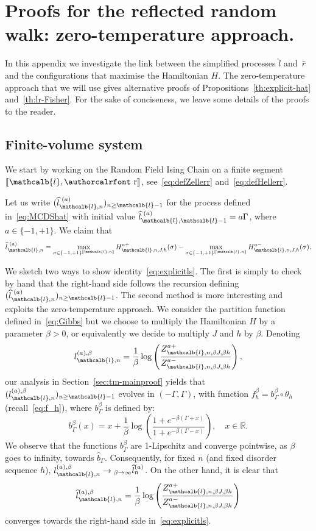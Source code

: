 \documentclass[10pt]{amsart}
\theoremstyle{definition}\newtheorem{defi}[theo]{Definition}\newtheorem{rema}[theo]{Remark}\newtheorem{exam}[theo]{Example}\newtheorem{exem}[theo]{Example}\newtheorem{nota}[theo]{Notation}
\newcommand{\mathcalc}[1]{\text{\authorcalrfont #1}}
\newcommand{\bbR}{\mathbb{R}}
\newcommand{\gb}{\beta}
\newcommand{\gG}{\Gamma}
\newcommand{\ls}{\widehat{l}}
\newcommand{\rs}{\widehat{r}}
\renewcommand{\ell}{\mathcalb{l}}
\newcommand{\err}{\mathcalc{r}}
\newcommand{\llbracket}{\mathopen{[\mkern -2.7mu[}}
\newcommand{\rrbracket}{\mathclose{]\mkern -2.7mu]}}
\newcommand{\lbra}{\llbracket}
\newcommand{\rbra}{\rrbracket}
\renewcommand*{\to}{\mathchoice{\longrightarrow}{\rightarrow}{\rightarrow}{\rightarrow}}
\begin{document}
\section{Proofs for the reflected random walk: zero-temperature approach.}\label{sec:appendzerotemp}


In this appendix we investigate the link between the simplified processes $\ls$ and~$\rs$ and the configurations that maximise the Hamiltonian $H$. The zero-temperature approach that we will use gives alternative proofs of Propositions~\ref{th:explicit-hat} and~\ref{th:lr-Fisher}. For the sake of conciseness, we leave some details of the proofs to the reader.

\subsection{Finite-volume system}

We start by working on the {Random Field Ising Chain} on a finite segment $\lbra\ell, \err\rbra$, see~\eqref{eq:defZellerr} and~\eqref{eq:defHellerr}.


Let us write $(\ls_{\ell, n}^{\,\,(a)})_{n\ge \ell-1}$ for the process defined in~\eqref{eq:MCDShat} with initial value $\ls_{\ell,\ell-1}^{\,\,(a)}= a \gG$, where $a\in\{-1, +1\}$. We claim that
\begin{equation}\label{eq:explicitls}
\ls_{\ell, n}^{\,\,(a)} = \max_{\sigma\in\{-1, +1\}^{\lbra\ell, n\rbra}} H_{\ell, n, J, h}^{a+}(\sigma) - \max_{\sigma\in\{-1, +1\}^{\lbra\ell, n\rbra}} H_{\ell, n, J, h}^{a-}(\sigma).
\end{equation}

We sketch two ways to show identity~\eqref{eq:explicitls}. The first is simply to check by hand that the right-hand side follows the recursion defining $(\ls_{\ell, n}^{\,\,(a)})_{n\ge \ell-1}$. The second method is more interesting and exploits the zero-temperature approach. We consider the partition function defined in~\eqref{eq:Gibbs} but we choose to multiply the Hamiltonian $H$ by a parameter $\beta>0$, or equivalently we decide to multiply $J$ and $h$ by $\beta$. Denoting
\[
l_{\ell, n}^{(a), \beta}= \frac{1}{\beta} \log\left(\frac{Z_{\ell, n, \beta J, \beta h}^{a+}}{Z_{\ell, n, \beta J, \beta h}^{a-}}\right),
\]
our analysis in Section~\ref{sec:tm-mainproof} yields that $(l_{\ell, n}^{(a), \beta})_{n\ge \ell-1}$ evolves in $(-\gG, \gG)$, with function $f^\gb_h=b_\gG^\gb \circ \theta_h$ (recall~\eqref{eq:f_h}), where $b_\gG^\gb$ is defined by:
\begin{equation}
b_\gG^\gb(x)=x+\frac1\gb \log\left(\frac{1+e^{-\gb(\gG+x)}}{1+e^{-\gb(\gG-x)}}\right), \quad x\in \bbR.
\end{equation}
We observe that the functions $b_\gG^\gb$ are 1-Lipschitz and converge pointwise, as $\beta$ goes to infinity, towards $\widehat b_\gG$. Consequently, for fixed $n$ (and fixed disorder sequence $h$), $l_{\ell, n}^{(a), \beta} \to_{\beta\to\infty} \ls_n^{(a)}$. On the other hand, it is clear that
\[
\ls_{\ell, n}^{(a), \beta}= \frac{1}{\beta} \log\left(\frac{Z_{\ell, n, \beta J, \beta h}^{a+}}{Z_{\ell, n, \beta J, \beta h}^{a-}}\right)
\]
converges towards the right-hand side in~\eqref{eq:explicitls}.
\end{document}
